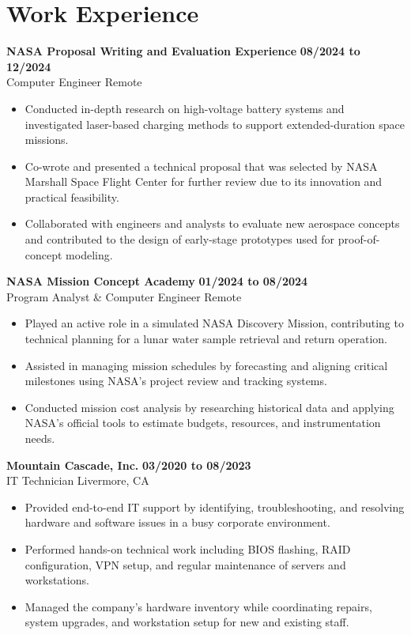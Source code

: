 \documentclass[letterpaper,11pt]{article}
\begin{document}
\section*{Work Experience}
\textbf{NASA Proposal Writing and Evaluation Experience} \hfill \textbf{08/2024 to 12/2024} \\
Computer Engineer  \hfill Remote
\begin{itemize}
    \item Conducted in-depth research on high-voltage battery systems and investigated laser-based charging methods to support
extended-duration space missions.
    \item Co-wrote and presented a technical proposal that was selected by NASA Marshall Space Flight Center for further review due
to its innovation and practical feasibility.
    \item Collaborated with engineers and analysts to evaluate new aerospace concepts and contributed to the design of early-stage
prototypes used for proof-of-concept modeling.
\end{itemize}
\vspace{4mm}
\textbf{NASA Mission Concept Academy} \hfill \textbf{01/2024 to 08/2024} \\
Program Analyst \& Computer Engineer \hfill Remote
\begin{itemize}
    \item Played an active role in a simulated NASA Discovery Mission, contributing to technical planning for a lunar water sample
retrieval and return operation.
    \item Assisted in managing mission schedules by forecasting and aligning critical milestones using NASA’s project review and
tracking systems.
    \item Conducted mission cost analysis by researching historical data and applying NASA’s official tools to estimate budgets,
resources, and instrumentation needs.
\end{itemize}
\vspace{4mm}
\textbf{Mountain Cascade, Inc.} \hfill \textbf{03/2020 to 08/2023} \\
IT Technician \hfill Livermore, CA
\begin{itemize}
    \item Provided end-to-end IT support by identifying, troubleshooting, and resolving hardware and software issues in a busy
corporate environment.
    \item Performed hands-on technical work including BIOS flashing, RAID configuration, VPN setup, and regular maintenance of
servers and workstations.
    \item Managed the company’s hardware inventory while coordinating repairs, system upgrades, and workstation setup for new and
existing staff.
\end{itemize}
\end{document}
